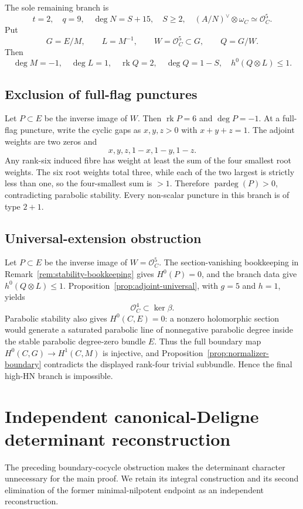\documentclass[11pt]{article}
\theoremstyle{definition}
\newcommand{\Ocal}{\mathcal O}
\newcommand{\rk}{\operatorname{rk}}
\newcommand{\degp}{\operatorname{pardeg}}
\begin{document}
The sole remaining branch is
\[
 t=2,\quad q=9,\quad\deg N=S+15,\quad S\ge2,
 \quad(A/N)^\vee\otimes\omega_C\simeq\Ocal_C^5.
\]
Put
\[
 G=E/M,
 \qquad L=M^{-1},
 \qquad W=\Ocal_C^5\subset G,
 \qquad Q=G/W.
\]
Then
\[
 \deg M=-1,
 \quad \deg L=1,
 \quad \rk Q=2,
 \quad \deg Q=1-S,
 \quad h^0(Q\otimes L)\le1.
\]

\subsection{Exclusion of full-flag punctures}

Let $P\subset E$ be the inverse image of $W$.  Then $\rk P=6$ and
$\deg P=-1$.  At a full-flag puncture, write the cyclic gaps as
$x,y,z>0$ with $x+y+z=1$.  The adjoint weights are two zeros and
\[
 x,y,z,1-x,1-y,1-z.
\]
Any rank-six induced fibre has weight at least the sum of the four smallest
root weights.  The six root weights total three, while each of the two
largest is strictly less than one, so the four-smallest sum is $>1$.
Therefore $\degp(P)>0$, contradicting parabolic stability.  Every non-scalar
puncture in this branch is of type $2+1$.

\subsection{Universal-extension obstruction}

Let $P\subset E$ be the inverse image of $W=\Ocal_C^5$.  The
section-vanishing bookkeeping in Remark~\ref{rem:stability-bookkeeping} gives $H^0(P)=0$,
and the branch data give
$h^0(Q\otimes L)\le1$.  Proposition~\ref{prop:adjoint-universal}, with
$g=5$ and $h=1$, yields
\[
 \Ocal_C^4\subset\ker\beta.
\]
Parabolic stability also gives $H^0(C,E)=0$: a nonzero holomorphic section
would generate a saturated parabolic line of nonnegative parabolic degree
inside the stable parabolic degree-zero bundle $E$.  Thus the full boundary
map $H^0(C,G)\to H^1(C,M)$ is injective, and
Proposition~\ref{prop:normalizer-boundary} contradicts the displayed
rank-four trivial subbundle.  Hence the final high-HN branch is impossible.

\section{Independent canonical-Deligne determinant reconstruction}
\label{sec:deligne}

The preceding boundary-cocycle obstruction makes the determinant character
unnecessary for the main proof.  We retain its integral construction and its
second elimination of the former minimal-nilpotent endpoint as an independent
reconstruction.
\end{document}
